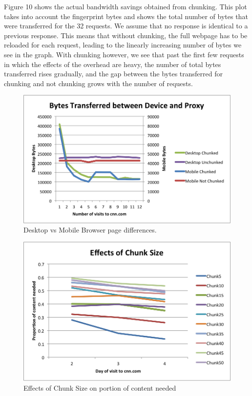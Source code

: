 Figure 10 shows the actual bandwidth savings obtained from chunking. This plot takes into account the fingerprint bytes and shows the total number of bytes that were transferred for the 32 requests.
We assume that no response is identical to a previous response. 
This means that without chunking, the full webpage has to be reloaded for each request, leading to the linearly increasing number of bytes we see in the graph. 
With chunking however, we see that past the first few requests in which the effects of the overhead are heavy, the number of total bytes transferred rises gradually, and the gap between the bytes transferred for chunking and not chunking grows with the number of requests.

\begin{figure}[h] 
\centering \includegraphics[width=\columnwidth]{images/desktopmobile.png}
\caption{Desktop vs Mobile Browser page differences.}
\end{figure}
\begin{figure}[h] 
\centering \includegraphics[width=\columnwidth]{images/chunksize.png}
\caption{Effects of Chunk Size on portion of content needed}
\end{figure}
